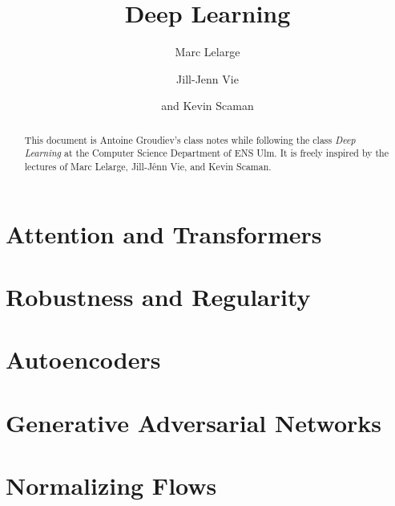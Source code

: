 \documentclass[toc, titlepaged]{../cs-classes/cs-classes}
\title{Deep Learning}
\author{Marc Lelarge\and Jill-Jenn Vie\and and Kevin Scaman}
\begin{document}
\begin{abstract}
    This document is Antoine Groudiev's class notes while following the class \emph{Deep Learning} at the Computer Science Department of ENS Ulm. It is freely inspired by the lectures of Marc Lelarge, Jill-Jênn Vie, and Kevin Scaman. 
\end{abstract}





% 




\section{Attention and Transformers}

\section{Robustness and Regularity}



\section{Autoencoders}

\section{Generative Adversarial Networks}

\section{Normalizing Flows}
\end{document}
